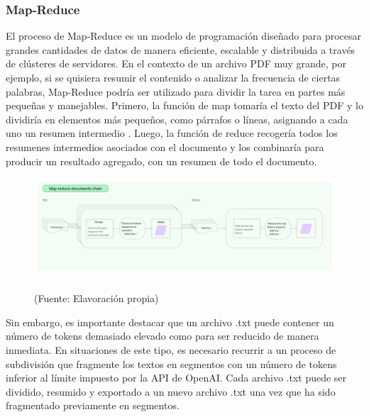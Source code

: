 \subsubsection{Map-Reduce}


\par El proceso de Map-Reduce es un modelo de programación diseñado para procesar grandes cantidades de datos de manera eficiente, 
escalable y distribuida a través de clústeres de servidores. En el contexto de un archivo PDF muy grande, por ejemplo, si se quisiera resumir 
el contenido o analizar la frecuencia de ciertas palabras, Map-Reduce podría ser utilizado para dividir la tarea en partes más pequeñas y manejables. 
Primero, la función de map tomaría el texto del PDF y lo dividiría en elementos más pequeños, como párrafos o líneas, 
asignando a cada uno un resumen intermedio \cite{mapreduce}. Luego, la función de reduce recogería todos los resumenes intermedios asociados con el documento 
y los combinaría para producir un resultado agregado, con un resumen de todo el documento. 


\begin{figure}[ht!]
    \centering
    \includegraphics[width=.9\textwidth]{figures/huemul_mapreduce.jpg}
    \caption[]{\\
    {\scriptsize (Fuente: Elavoración propia)}}
    \label{fig:chatbot1}
\end{figure}

\par Sin embargo, es importante destacar que un archivo .txt puede contener un número de tokens demasiado elevado como para ser 
reducido de manera inmediata. En situaciones de este tipo, es necesario recurrir a un proceso de subdivisión que fragmente los 
textos en segmentos con un número de tokens inferior al límite impuesto por la API de OpenAI.
Cada archivo .txt puede ser dividido, 
resumido y exportado a un nuevo archivo .txt una vez que ha sido fragmentado previamente en segmentos.

